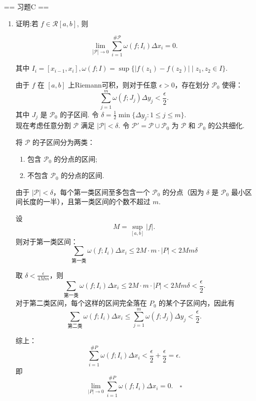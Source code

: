 == 习题C ==

\begin{enumerate}
    \item[1.]证明:若 \(\displaystyle f\in \mathcal{R}[a,b]\), 则

    \[\displaystyle \lim_{|\mathcal{P}|\to 0}\sum_{i = 1}^{\#\mathcal{P}}\omega (f;I_i)\Delta x_i = 0.\]

    其中 \(\displaystyle I_{i} = [x_{i - 1},x_{i}],\omega (f;I) = \sup \{|f(z_{1}) - f(z_{2})|\mid z_{1},z_{2}\in I\}.\)
    \begin{solution}
        由于 $f$ 在 $[a,b]$ 上Riemann可积，则对于任意 $\epsilon > 0$，存在划分 $\mathcal{P}_0$ 使得：
        \[
        \sum_{j=1}^{m} \omega(f; J_j) \Delta y_j < \frac{\epsilon}{2}.
        \]
        其中 $J_j$ 是 $\mathcal{P}_0$ 的子区间.
        令 $\displaystyle \delta = \frac{1}{2} \min\{\Delta y_j : 1 \leq j \leq m\}$.\\
        现在考虑任意分割 $\mathcal{P}$ 满足 $|\mathcal{P}| < \delta$. 令 $\mathcal{P'} = \mathcal{P} \cup \mathcal{P}_0$ 为 $\mathcal{P}$ 和 $\mathcal{P}_0$ 的公共细化.

        将 $\mathcal{P}$ 的子区间分为两类：
        \begin{enumerate}
            \item[第一类：] 包含 $\mathcal{P}_0$ 的分点的区间;
            \item[第二类：] 不包含 $\mathcal{P}_0$ 的分点的区间.
        \end{enumerate}

        由于 $|\mathcal{P}| < \delta$，每个第一类区间至多包含一个 $\mathcal{P}_0$ 的分点（因为 $\delta$ 是 $\mathcal{P}_0$ 最小区间长度的一半），且第一类区间的个数不超过 $m$.

        设 
        \[
        M = \sup_{[a,b]} |f|.
        \]
        则对于第一类区间：
        \[
        \sum_{\text{第一类}} \omega(f; I_i) \Delta x_i \leq 2M \cdot m \cdot |P| < 2M m \delta
        \]

        取 $\displaystyle \delta < \frac{\epsilon}{4Mm}$，则
        \[
        \sum_{\text{第一类}} \omega(f; I_i) \Delta x_i \leq 2M \cdot m \cdot |P| < 2M m \delta< \frac{\epsilon}{2}.
        \]
        对于第二类区间，每个这样的区间完全落在 $P_0$ 的某个子区间内，因此有
        \[
        \sum_{\text{第二类}} \omega(f; I_i) \Delta x_i \leq \sum_{j=1}^{m} \omega(f; J_j) \Delta y_j < \frac{\epsilon}{2}.
        \]

        综上：
        \[
        \sum_{i=1}^{\#P} \omega(f; I_i) \Delta x_i < \frac{\epsilon}{2} + \frac{\epsilon}{2} = \epsilon.
        \]
        即
        \[
        \lim_{|P| \to 0} \sum_{i=1}^{\#P} \omega(f; I_i) \Delta x_i = 0.  \quad\square
        \]
    \end{solution}
    

\end{enumerate}
